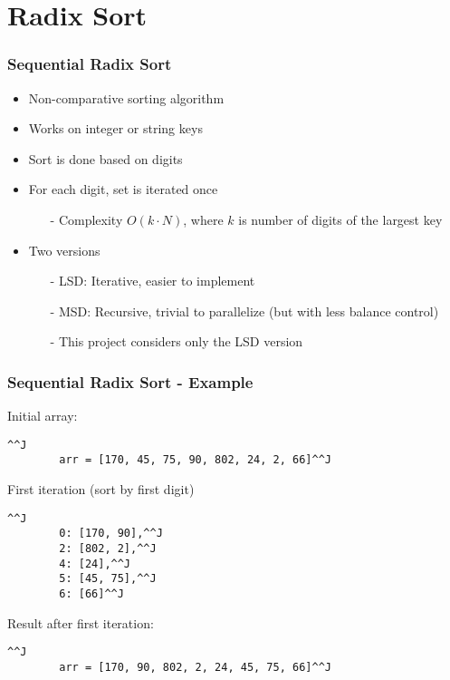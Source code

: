 \section{Radix Sort}

\begin{frame}
	\frametitle{Sequential Radix Sort}

	\begin{itemize}\itemsep=10pt
		\item Non-comparative sorting algorithm
		\item Works on integer or string keys
		\item Sort is done based on digits
		\item For each digit, set is iterated once
		\begin{itemize}
			\item[-] Complexity $O(k \cdot N)$, where $k$ is number of digits of the largest key
		\end{itemize}

		\item Two versions
			\begin{itemize}
				\item[-] LSD: Iterative, easier to implement
				\item[-] MSD: Recursive, trivial to parallelize (but with less balance control)
				\item[-] This project considers only the LSD version
			\end{itemize}
	\end{itemize}
\end{frame}

\begin{frame}
   \frametitle{Sequential Radix Sort - Example}

	Initial array:
	\begin{lstlisting}^^J
		arr = [170, 45, 75, 90, 802, 24, 2, 66]^^J
	\end{lstlisting}

	First iteration (sort by first digit)
	\begin{lstlisting}^^J
		0: [170, 90],^^J
		2: [802, 2],^^J
		4: [24],^^J
		5: [45, 75],^^J
		6: [66]^^J
	\end{lstlisting}

	Result after first iteration:
	\begin{lstlisting}^^J
		arr = [170, 90, 802, 2, 24, 45, 75, 66]^^J
	\end{lstlisting}
	
\end{frame}

